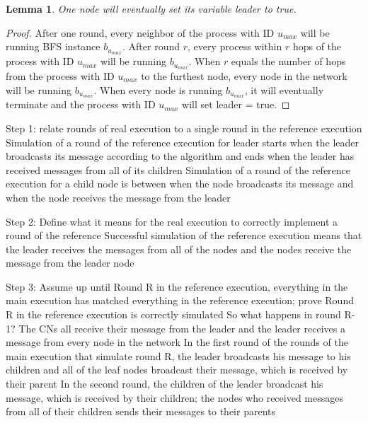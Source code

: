 \documentclass[english]{article}
\newtheorem{lemma}[theorem]{Lemma}
\begin{document}
\begin{lemma}
\label{LELivenessStatic}
  One node will eventually set its variable leader to true.
\end{lemma}
\begin{proof}

  After one round, every neighbor of the process with ID $u_{max}$ will be running BFS instance $b_{u_{max}}$.
  After round $r$, every process within $r$ hops of the process with ID $u_{max}$ will be running  $b_{u_{max}}$.
  When $r$ equals the number of hops from the process with ID $u_{max}$ to the furthest node, every node in the network will be running $b_{u_{max}}$.
  When every node is running $b_{u_{max}}$, it will eventually terminate and the process with ID $u_{max}$ will set leader = true.

\end{proof}


Step 1: relate rounds of real execution to a single round in the reference execution \;
Simulation of a round of the reference execution for leader starts when the leader broadcasts its message according to the algorithm and ends when the leader has received messages from all of its children \;
Simulation of a round of the reference execution for a child node is between when the node broadcasts its message and when the node receives the message from the leader \;

Step 2: Define what it means for the real execution to correctly implement a round of the reference \;
Successful simulation of the reference execution means that the leader receives the messages from all of the nodes and the nodes receive the message from the leader node \;

Step 3: Assume up until Round R in the reference execution, everything in the main execution has matched everything in the reference execution; prove Round R in the reference execution is correctly simulated \;
So what happens in round R-1? The CNs all receive their message from the leader and the leader receives a message from every node in the network \;
In the first round of the rounds of the main execution that simulate round R, the leader broadcasts his message to his children and all of the leaf nodes broadcast their message, which is received by their parent \;
In the second round, the children of the leader broadcast his message, which is received by their children; the nodes who received messages from all of their children sends their messages to their parents \;
\end{document}

